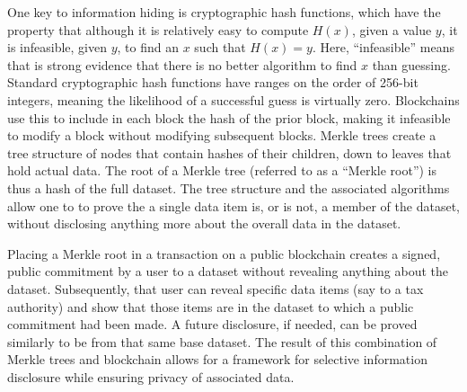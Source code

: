 \documentclass[11pt,dvipdfm]{article}
\begin{document}
One key to information hiding is cryptographic  hash functions, which have the property that
although it is relatively easy to compute $H(x)$, given a value $y$, it is infeasible, given $y$, to find an $x$ such that
$H(x)=y$.  Here, ``infeasible'' means that is strong evidence that there is no better algorithm to find $x$ than
guessing.  Standard cryptographic hash functions have ranges on the order of 256-bit integers, meaning the
likelihood of a successful guess is virtually zero.
Blockchains use this to include in each block the hash of the prior block, making it infeasible to modify a block
without modifying subsequent blocks.
Merkle trees\cite{Merkle87} create a tree structure of nodes that contain hashes of their children, down to leaves that hold
actual data. The root of a Merkle tree (referred to as a ``Merkle root'') is thus a hash of the full dataset.  The tree structure and the associated
algorithms allow one to to prove the a single data item is, or is not, a member of the dataset, without disclosing
anything more about the overall data in the dataset.

Placing a Merkle root in a transaction on a public blockchain creates a signed, public commitment by a user to a dataset without revealing
anything about the dataset.  
Subsequently, that user can reveal specific data items (say to a tax authority) and show that those items are in 
the dataset to which a public commitment had been made.  
A future disclosure, if needed, can be proved similarly to be from that same base dataset.
The result of this combination of Merkle trees and blockchain allows for a framework for selective information disclosure
while ensuring privacy of associated data. 
\end{document}
